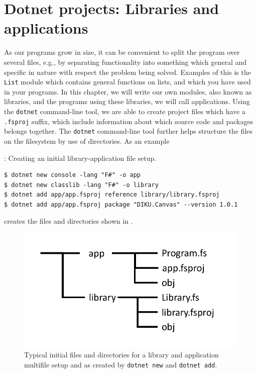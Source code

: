 \documentclass[fsharpNotes.tex]{subfiles}
\begin{document}
\section{Dotnet projects: Libraries and applications}
\label{chap:projects}
As our programs grow in size, it can be convenient to split the program over several files, e.g., by separating functionality into something which general and specific in  nature with respect the problem being solved. Examples of this is the \lstinline{List} module which contains general functions on lists, and which you have used in your programs. In this chapter, we will write our own modules, also known as libraries, and the programs using these libraries, we will call applications. Using the \lstinline[language=console]{dotnet} command-line tool, we are able to create project files which have a \lstinline[language=console]{.fsproj} suffix, which include information about which source code and packages belongs together. The \lstinline[language=console]{dotnet} command-line tool further helps structure the files on the filesystem by use of directories. As an example
\begin{codeNOutput}[label=dotnetNew,
  top=-5pt,
  bottom=-5pt,
  left=-2pt,
  right=-2pt,
]{: Creating an initial library-application file setup.}
  \begin{lstlisting}[language=console,escapechar=§]
$ dotnet new console -lang "F#" -o app
$ dotnet new classlib -lang "F#" -o library
$ dotnet add app/app.fsproj reference library/library.fsproj
$ dotnet add app/app.fsproj package "DIKU.Canvas" --version 1.0.1
\end{lstlisting}
\end{codeNOutput}
creates the files and directories shown in .
\begin{figure} %
  \centering
  \includegraphics[width=0.5\linewidth]{dotnetNew}
  \caption{Typical initial files and directories for a library and application multifile setup and as created by \lstinline[language=console]{dotnet new} and  \lstinline[language=console]{dotnet add}.}
  \label{fig:dotnetNewFileSystem}
\end{figure}
\end{document}
